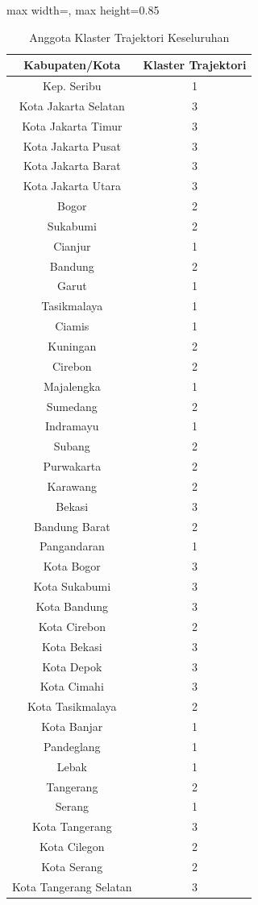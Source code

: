 \begin{table}[H]
\centering
\caption{Anggota Klaster Trajektori Keseluruhan} \label{tab:appclustermembers}
\begin{adjustbox}{max width=\textwidth, max height=0.85\textheight}
\begin{tabular}{|c|c|}
\hline
\textbf{Kabupaten/Kota} & \textbf{Klaster Trajektori} \\
\hline
Kep. Seribu & 1 \\
Kota Jakarta Selatan & 3 \\
Kota Jakarta Timur & 3 \\
Kota Jakarta Pusat & 3 \\
Kota Jakarta Barat & 3 \\
Kota Jakarta Utara & 3 \\
Bogor & 2 \\
Sukabumi & 2 \\
Cianjur & 1 \\
Bandung & 2 \\
Garut & 1 \\
Tasikmalaya & 1 \\
Ciamis & 1 \\
Kuningan & 2 \\
Cirebon & 2 \\
Majalengka & 1 \\
Sumedang & 2 \\
Indramayu & 1 \\
Subang & 2 \\
Purwakarta & 2 \\
Karawang & 2 \\
Bekasi & 3 \\
Bandung Barat & 2 \\
Pangandaran & 1 \\
Kota Bogor & 3 \\
Kota Sukabumi & 3 \\
Kota Bandung & 3 \\
Kota Cirebon & 2 \\
Kota Bekasi & 3 \\
Kota Depok & 3 \\
Kota Cimahi & 3 \\
Kota Tasikmalaya & 2 \\
Kota Banjar & 1 \\
Pandeglang & 1 \\
Lebak & 1 \\
Tangerang & 2 \\
Serang & 1 \\
Kota Tangerang & 3 \\
Kota Cilegon & 2 \\
Kota Serang & 2 \\
Kota Tangerang Selatan & 3 \\
\hline
\end{tabular}
\end{adjustbox}
\end{table}